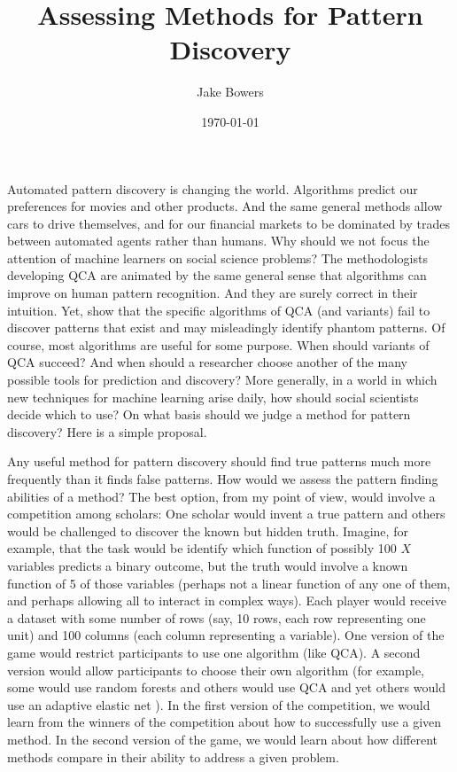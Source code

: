 \documentclass[12pt]{article}
\title{Assessing Methods for Pattern Discovery}
\author{Jake Bowers}
\date{\today}
\begin{document}
\maketitle

Automated pattern discovery is changing the world. Algorithms predict our
preferences for movies and other products. And the same general methods allow
cars to drive themselves, and for our financial markets to be dominated by
trades between automated agents rather than humans. Why should we not focus
the attention of machine learners on social science problems? The
methodologists developing QCA are animated by the same general sense that
algorithms can improve on human pattern recognition. And they are surely
correct in their intuition. Yet, \citet{lucasfk2013} show that the specific
algorithms of QCA (and variants) fail to discover patterns that exist and may
misleadingly identify phantom patterns. Of course, most algorithms are useful
for some purpose. When should variants of QCA succeed? And when should a
researcher choose another of the many possible tools for prediction and
discovery? More generally, in a world in which new techniques for machine
learning arise daily, how should social scientists decide which to use? On
what basis should we judge a method for pattern discovery? Here is a simple
proposal.

Any useful method for pattern discovery should find true patterns much more
frequently than it finds false patterns. How would we assess the pattern
finding abilities of a method? The best option, from my point of view, would
involve a competition among scholars: One scholar would invent a true pattern
and others would be challenged to discover the known but hidden truth.
Imagine, for example, that the task would be identify which function of
possibly 100 $X$ variables predicts a binary outcome, but the truth would
involve a known function of 5 of those variables (perhaps not a linear
function of any one of them, and perhaps allowing all to interact in complex
ways). Each player would receive a dataset with some number of rows (say, 10
rows, each row representing one unit) and 100 columns (each column
representing a variable). One version of the game would restrict participants to use one
algorithm (like QCA). A second version would allow participants to choose
their own algorithm (for example, some would use random forests
\cite{breiman2001random} and others would use QCA and yet others would use an
adaptive elastic net \citet{zou2009adaptive,zou2006adaptive}). In the first
version of the competition, we would learn from the winners of the competition
about how to successfully use a given method. In the second version of the
game, we would learn about how different methods compare in their ability to
address a given problem. 
\end{document}
